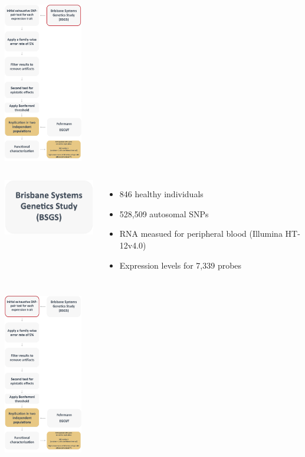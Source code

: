 \documentclass{beamer}
\begin{document}
\begin{frame}
\begin{center}
\includegraphics[height=7cm]{images/methods2.png} \\
\end{center}
\end{frame}

\begin{frame}
\begin{columns}[c]
\includegraphics[width=4.5cm]{images/BSGS.png} \\
\begin{itemize}
\item 846 healthy individuals 
\vspace{0.3cm}
\item 528,509 autosomal SNPs
\vspace{0.3cm}
\item RNA measued for peripheral blood (Illumina HT-12v4.0)
\vspace{0.3cm}
\item Expression levels for 7,339 probes 
\end{itemize}
\end{columns}
\end{frame}

\begin{frame}
\begin{center}
\includegraphics[height=7cm]{images/methods3.png} \\
\end{center}
\end{frame}
\end{document}
